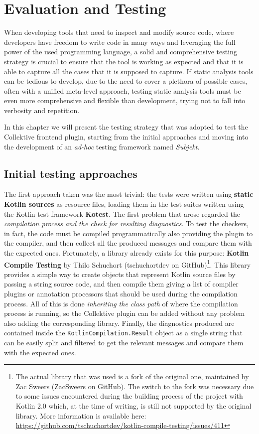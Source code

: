 \documentclass[12pt,a4paper,openright,twoside]{book}
\begin{document}
\chapter{Evaluation and Testing}
\label{chap:evaluation}

When developing tools that need to inspect and modify source code, where
developers have freedom to write code in many ways and leveraging the full power of the 
used programming language, a solid and comprehensive testing strategy is crucial to 
ensure that the tool is working as expected and that it is able to capture all the
cases that it is supposed to capture.
%
If static analysis tools can be tedious to develop, due to the need to cover a
plethora of possible cases, often with a unified meta-level approach, testing
static analysis tools must be even more comprehensive and flexible than
development, trying not to fall into verbosity and repetition.

In this chapter we will present the testing strategy that was adopted to test the 
Collektive frontend plugin, starting from the initial approaches and moving into the 
development of an \emph{ad-hoc} testing framework named \emph{Subjekt}.

\section{Initial testing approaches}

The first approach taken was the most trivial: the tests were written using
\textbf{static Kotlin sources} as resource files, loading them in the test
suites written using the Kotlin test framework \textbf{Kotest}. The first
problem that arose regarded the \emph{compilation process and the check for
resulting diagnostics}. To test the checkers, in fact, the code must be compiled
programmatically also providing the plugin to the compiler, and then collect all
the produced messages and compare them with the expected ones.
%
Fortunately, a library already exists for this purpose: \textbf{Kotlin Compile
Testing} by Thilo Schuchort (tschuchortdev on GitHub)\footnote{The actual
library that was used is a fork of the original one, maintained by Zac Sweers
(ZacSweers on GitHub). The switch to the fork was necessary due to some issues
encountered during the building process of the project with Kotlin 2.0 which,
at the time of writing, is still not supported by the original library. More
information is available here:
\url{https://github.com/tschuchortdev/kotlin-compile-testing/issues/411}}.
This library provides a simple way to create objects that represent Kotlin source
files by passing a string source code, and then compile them giving a list of
compiler plugins or annotation processors that should be used during the
compilation process. All of this is done \emph{inheriting the class path} of
where the compilation process is running, so the Collektive plugin can be added
without any problem also adding the corresponding library. Finally, the
diagnostics produced are contained inside the
\lstinline{KotlinCompilation.Result} object as a single string that can be
easily split and filtered to get the relevant messages and compare them with the
expected ones.
\end{document}
